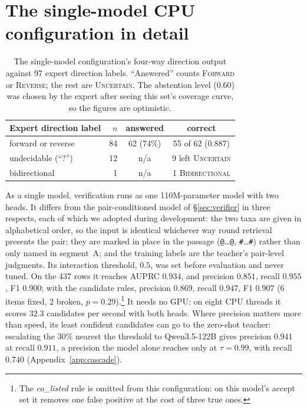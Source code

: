\documentclass[11pt]{article}
\begin{document}
\section{The single-model CPU configuration in detail}
\label{app:deploy}

\begin{table}[t]\centering\small
\setlength{\tabcolsep}{3.6pt}
\begin{tabular}{lrcc}
\toprule
Expert direction label & $n$ & answered & correct \\
\midrule
forward or reverse     & 84 & 62 (74\%) & 55 of 62 (0.887) \\
undecidable (``?'')    & 12 & n/a & 9 left \textsc{Uncertain} \\
bidirectional          &  1 & n/a & 1 \textsc{Bidirectional} \\
\bottomrule
\end{tabular}
\caption{The single-model configuration's four-way direction output against 97 expert direction labels.
``Answered'' counts \textsc{Forward} or \textsc{Reverse}; the rest are \textsc{Uncertain}. The
abstention level ($0.60$) was chosen by the expert after seeing this set's coverage curve, so the
figures are optimistic.}
\label{tab:direction}
\end{table}

As a single model, verification runs as one 110M-parameter model with two heads. It differs from the
pair-conditioned model of \S\ref{sec:verifier} in three respects, each of which we adopted during
development: the two taxa are given in alphabetical order, so the input is identical whichever way
round retrieval presents the pair; they are marked in place in the passage (\texttt{@}\ldots\texttt{@},
\texttt{\#}\ldots\texttt{\#}) rather than only named in segment~A; and the training labels are the
teacher's pair-level judgments. Its interaction threshold, $0.5$, was set before evaluation and never
tuned. On the 437 rows it reaches AUPRC $0.934$, and precision $0.851$, recall $0.955$, F1 $0.900$;
with the candidate rules, precision $0.869$, recall $0.947$, F1 $0.907$ (6 items fixed, 2 broken,
$p = 0.29$).\footnote{The \emph{co\_listed} rule is omitted from this configuration: on this
model's accept set it removes one false positive at the cost of three true ones.} It needs no GPU: on
eight CPU threads it scores $32.3$ candidates per second with both heads. Where precision matters more than speed, its least confident candidates can go to
the zero-shot teacher: escalating the $30\%$ nearest the threshold to Qwen3.5-122B gives precision
$0.941$ at recall $0.911$, a precision the model alone reaches only at $\tau = 0.99$, with recall
$0.740$ (Appendix~\ref{app:cascade}).
\end{document}
